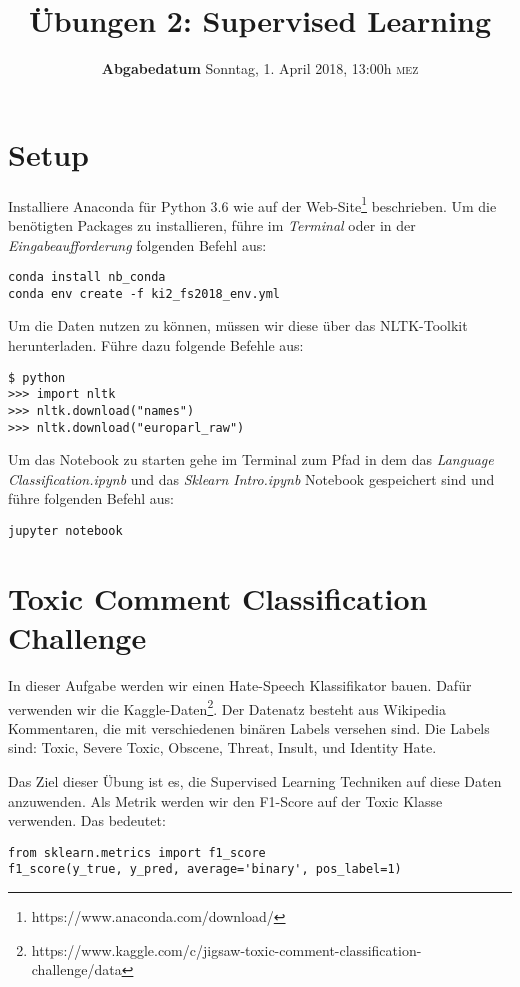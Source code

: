 \documentclass[a4paper,10pt]{article}
\title{Übungen 2: Supervised Learning}
\date{\textbf{Abgabedatum} Sonntag, 1. April 2018, 13:00h \textsc{mez}
}
\begin{document}
\maketitle

\section*{Setup}
Installiere Anaconda für Python 3.6 wie auf der Web-Site\footnote{https://www.anaconda.com/download/} beschrieben. Um die benötigten Packages zu installieren, führe im \emph{Terminal} oder in der \emph{Eingabeaufforderung} folgenden Befehl aus: 
\begin{lstlisting}[keepspaces=true,basicstyle=\ttfamily\footnotesize,language={}]
conda install nb_conda
conda env create -f ki2_fs2018_env.yml
\end{lstlisting}
Um die Daten nutzen zu können, müssen wir diese über das NLTK-Toolkit herunterladen. Führe dazu folgende Befehle aus:
\begin{lstlisting}[keepspaces=true,basicstyle=\ttfamily\footnotesize,language={}]
$ python
>>> import nltk
>>> nltk.download("names")
>>> nltk.download("europarl_raw")
\end{lstlisting}
Um das Notebook zu starten gehe im Terminal zum Pfad in dem das \emph{Language Classification.ipynb} und das \emph{Sklearn Intro.ipynb} Notebook gespeichert sind und führe folgenden Befehl aus:
\begin{lstlisting}[keepspaces=true,basicstyle=\ttfamily\footnotesize,language={}]
jupyter notebook
\end{lstlisting}

\section{Toxic Comment Classification Challenge}
In dieser Aufgabe werden wir einen Hate-Speech Klassifikator bauen. Dafür verwenden wir die Kaggle-Daten\footnote{https://www.kaggle.com/c/jigsaw-toxic-comment-classification-challenge/data}. Der Datenatz besteht aus Wikipedia Kommentaren, die mit verschiedenen binären Labels versehen sind. Die Labels sind: Toxic, Severe Toxic, Obscene, Threat, Insult, und Identity Hate.

Das Ziel dieser Übung ist es, die Supervised Learning Techniken auf diese Daten anzuwenden. Als Metrik werden wir den F1-Score auf der Toxic Klasse verwenden. Das bedeutet:
\begin{lstlisting}[keepspaces=true,basicstyle=\ttfamily\footnotesize,language={}]
from sklearn.metrics import f1_score
f1_score(y_true, y_pred, average='binary', pos_label=1)
\end{lstlisting}
\end{document}

